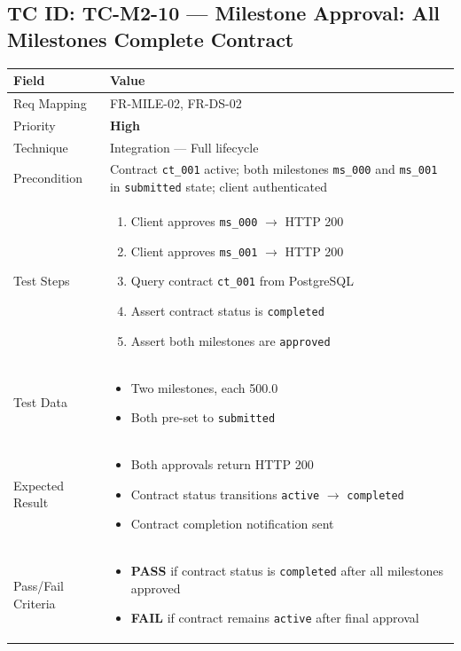 \documentclass[12pt,a4paper]{article}
\newcommand{\sevhigh}{\textcolor{severityhigh}{\textbf{High}}}
\newcommand{\passresult}{\textcolor{passgreen}{\textbf{PASS}}}
\newcommand{\failresult}{\textcolor{failred}{\textbf{FAIL}}}
\begin{document}
\vspace{0.8cm}

\subsection{TC ID: TC-M2-10 --- Milestone Approval: All Milestones Complete Contract}

\begin{tabular}{|p{}|p{}|}
\hline
\rowcolor{lightblue} \textbf{Field} & \textbf{Value} \\
\hline
Req Mapping & FR-MILE-02, FR-DS-02 \\
\hline
Priority & \sevhigh \\
\hline
Technique & Integration --- Full lifecycle \\
\hline
Precondition & Contract \texttt{ct\_001} active; both milestones \texttt{ms\_000} and \texttt{ms\_001} in \texttt{submitted} state; client authenticated \\
\hline
Test Steps &
\begin{enumerate}[nosep, leftmargin=*]
  \item Client approves \texttt{ms\_000} $\rightarrow$ HTTP 200
  \item Client approves \texttt{ms\_001} $\rightarrow$ HTTP 200
  \item Query contract \texttt{ct\_001} from PostgreSQL
  \item Assert contract status is \texttt{completed}
  \item Assert both milestones are \texttt{approved}
\end{enumerate} \\
\hline
Test Data &
\begin{itemize}[nosep, leftmargin=*]
  \item Two milestones, each 500.0
  \item Both pre-set to \texttt{submitted}
\end{itemize} \\
\hline
Expected Result &
\begin{itemize}[nosep, leftmargin=*]
  \item Both approvals return HTTP 200
  \item Contract status transitions \texttt{active} $\rightarrow$ \texttt{completed}
  \item Contract completion notification sent
\end{itemize} \\
\hline
Pass/Fail Criteria &
\begin{itemize}[nosep, leftmargin=*]
  \item \passresult{} if contract status is \texttt{completed} after all milestones approved
  \item \failresult{} if contract remains \texttt{active} after final approval
\end{itemize} \\
\hline
\end{tabular}
\end{document}
